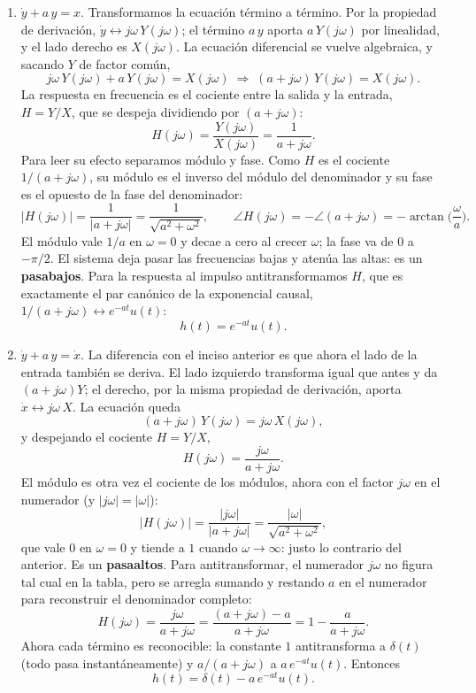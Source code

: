 \documentclass[10pt,a4paper]{article}
\begin{document}
	\begin{enumerate}[label=\textbf{\alph*)}]
		\item $\dot{y}+a\,y=x$. Transformamos la ecuación término a término. Por la propiedad de derivación, $\dot{y}\leftrightarrow j\omega\,Y(j\omega)$; el término $a\,y$ aporta $a\,Y(j\omega)$ por linealidad, y el lado derecho es $X(j\omega)$. La ecuación diferencial se vuelve algebraica, y sacando $Y$ de factor común,
		\[
			j\omega\,Y(j\omega)+a\,Y(j\omega)=X(j\omega)
			\;\Longrightarrow\;
			(a+j\omega)\,Y(j\omega)=X(j\omega).
		\]
		La respuesta en frecuencia es el cociente entre la salida y la entrada, $H=Y/X$, que se despeja dividiendo por $(a+j\omega)$:
		\[
			\boxed{H(j\omega)=\frac{Y(j\omega)}{X(j\omega)}=\frac{1}{a+j\omega}.}
		\]
		Para leer su efecto separamos módulo y fase. Como $H$ es el cociente $1/(a+j\omega)$, su módulo es el inverso del módulo del denominador y su fase es el opuesto de la fase del denominador:
		\[
			|H(j\omega)|=\frac{1}{|a+j\omega|}=\frac{1}{\sqrt{a^2+\omega^2}},
			\qquad
			\angle H(j\omega)=-\angle(a+j\omega)=-\arctan\!\Big(\frac{\omega}{a}\Big).
		\]
		El módulo vale $1/a$ en $\omega=0$ y decae a cero al crecer $\omega$; la fase va de $0$ a $-\pi/2$. El sistema deja pasar las frecuencias bajas y atenúa las altas: es un \textbf{pasabajos}. Para la respuesta al impulso antitransformamos $H$, que es exactamente el par canónico de la exponencial causal, $1/(a+j\omega)\leftrightarrow e^{-at}u(t)$:
		\[
			h(t)=e^{-at}u(t).
		\]

		\item $\dot{y}+a\,y=\dot{x}$. La diferencia con el inciso anterior es que ahora el lado de la entrada también se deriva. El lado izquierdo transforma igual que antes y da $(a+j\omega)Y$; el derecho, por la misma propiedad de derivación, aporta $\dot{x}\leftrightarrow j\omega\,X$. La ecuación queda
		\[
			(a+j\omega)\,Y(j\omega)=j\omega\,X(j\omega),
		\]
		y despejando el cociente $H=Y/X$,
		\[
			\boxed{H(j\omega)=\frac{j\omega}{a+j\omega}.}
		\]
		El módulo es otra vez el cociente de los módulos, ahora con el factor $j\omega$ en el numerador (y $|j\omega|=|\omega|$):
		\[
			|H(j\omega)|=\frac{|j\omega|}{|a+j\omega|}=\frac{|\omega|}{\sqrt{a^2+\omega^2}},
		\]
		que vale $0$ en $\omega=0$ y tiende a $1$ cuando $\omega\to\infty$: justo lo contrario del anterior. Es un \textbf{pasaaltos}. Para antitransformar, el numerador $j\omega$ no figura tal cual en la tabla, pero se arregla sumando y restando $a$ en el numerador para reconstruir el denominador completo:
		\[
			H(j\omega)=\frac{j\omega}{a+j\omega}=\frac{(a+j\omega)-a}{a+j\omega}=1-\frac{a}{a+j\omega}.
		\]
		Ahora cada término es reconocible: la constante $1$ antitransforma a $\delta(t)$ (todo pasa instantáneamente) y $a/(a+j\omega)$ a $a\,e^{-at}u(t)$. Entonces
		\[
			h(t)=\delta(t)-a\,e^{-at}u(t).
		\]


\end{enumerate}
\end{document}
